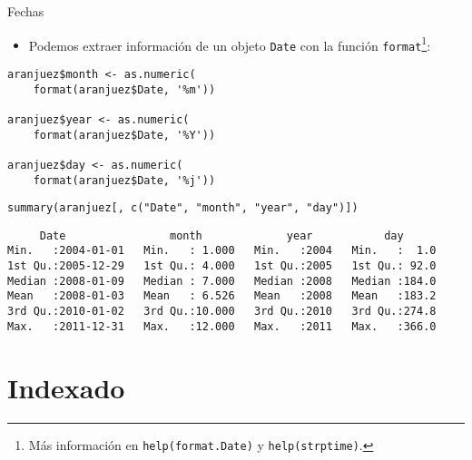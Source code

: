 \documentclass[aspectratio=169, usenames,svgnames,dvipsnames]{beamer}
\begin{document}
\begin{frame}[label={sec:orgc513235},fragile]{Fechas}
 \begin{itemize}
\item Podemos extraer información de un objeto \texttt{Date} con la función \texttt{format}\footnote{Más información en \texttt{help(format.Date)} y \texttt{help(strptime)}.}:
\end{itemize}
\lstset{language=r,label= ,caption= ,captionpos=b,numbers=none}
\begin{lstlisting}
aranjuez$month <- as.numeric(
    format(aranjuez$Date, '%m'))

aranjuez$year <- as.numeric(
    format(aranjuez$Date, '%Y'))

aranjuez$day <- as.numeric(
    format(aranjuez$Date, '%j'))
\end{lstlisting}

\lstset{language=r,label= ,caption= ,captionpos=b,numbers=none}
\begin{lstlisting}
summary(aranjuez[, c("Date", "month", "year", "day")])
\end{lstlisting}

\begin{verbatim}
     Date                month             year           day       
Min.   :2004-01-01   Min.   : 1.000   Min.   :2004   Min.   :  1.0  
1st Qu.:2005-12-29   1st Qu.: 4.000   1st Qu.:2005   1st Qu.: 92.0  
Median :2008-01-09   Median : 7.000   Median :2008   Median :184.0  
Mean   :2008-01-03   Mean   : 6.526   Mean   :2008   Mean   :183.2  
3rd Qu.:2010-01-02   3rd Qu.:10.000   3rd Qu.:2010   3rd Qu.:274.8  
Max.   :2011-12-31   Max.   :12.000   Max.   :2011   Max.   :366.0
\end{verbatim}
\end{frame}

\section{Indexado}
\label{sec:orgb57a631}
\end{document}
